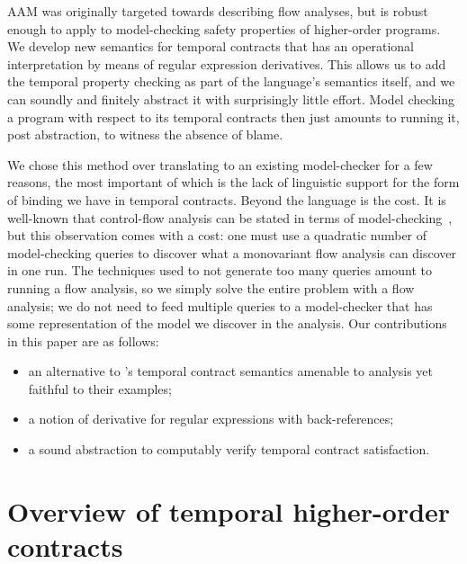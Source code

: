 AAM was originally targeted towards describing flow analyses, but is robust enough to apply to model-checking safety properties of higher-order programs.
%
We develop new semantics for temporal contracts that has an operational interpretation by means of regular expression derivatives.
%
This allows us to add the temporal property checking as part of the language's semantics itself, and we can soundly and finitely abstract it with surprisingly little effort.
%
Model checking a program with respect to its temporal contracts then just amounts to running it, post abstraction, to witness the absence of blame.

We chose this method over translating to an existing model-checker for a few reasons, the most important of which is the lack of linguistic support for the form of binding we have in temporal contracts.
%
Beyond the language is the cost.
%
It is well-known that control-flow analysis can be stated in terms of model-checking~\citep{ianjohnson:analysis-is-mc}, but this observation comes with a cost: one must use a quadratic number of model-checking queries to discover what a monovariant flow analysis can discover in one run.
%
The techniques used to not generate too many queries amount to running a flow analysis, so we simply solve the entire problem with a flow analysis; we do not need to feed multiple queries to a model-checker that has some representation of the model we discover in the analysis.
%
Our contributions in this paper are as follows:
\begin{itemize}
 \item{an alternative to \dfm's temporal contract semantics amenable to analysis yet faithful to their examples;}
 \item{a notion of derivative for regular expressions with back-references;}
 \item{a sound abstraction to computably verify temporal contract satisfaction.}
\end{itemize}

\section{Overview of temporal higher-order contracts}

